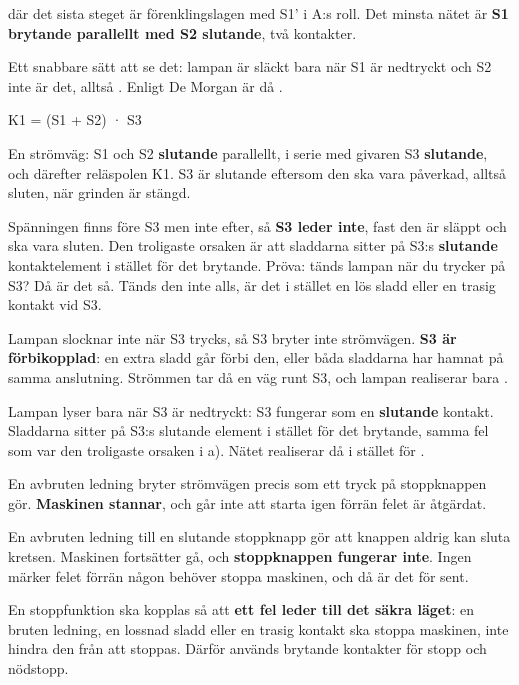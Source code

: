 \noindent där det sista steget är förenklingslagen med S1' i A:s roll. Det minsta nätet är
\textbf{S1 brytande parallellt med S2 slutande}, två kontakter.

Ett snabbare sätt att se det: lampan är släckt bara när S1 är nedtryckt och S2 inte är det, alltså
. Enligt De Morgan är då .

\leavevmode

\begin{textdrawing}
K1 = (S1 + S2) · S3
\end{textdrawing}

\noindent En strömväg: S1 och S2 \textbf{slutande} parallellt, i serie med givaren S3
\textbf{slutande}, och därefter reläspolen K1. S3 är slutande eftersom den ska vara påverkad,
alltså sluten, när grinden är stängd.

Spänningen finns före S3 men inte efter, så \textbf{S3 leder inte}, fast den är släppt och
ska vara sluten. Den troligaste orsaken är att sladdarna sitter på S3:s \textbf{slutande}
kontaktelement i stället för det brytande. Pröva: tänds lampan när du trycker på S3? Då är det så.
Tänds den inte alls, är det i stället en lös sladd eller en trasig kontakt vid S3.

Lampan slocknar inte när S3 trycks, så S3 bryter inte strömvägen. \textbf{S3 är
förbikopplad}: en extra sladd går förbi den, eller båda sladdarna har hamnat på samma anslutning.
Strömmen tar då en väg runt S3, och lampan realiserar bara .

Lampan lyser bara när S3 är nedtryckt: S3 fungerar som en \textbf{slutande} kontakt.
Sladdarna sitter på S3:s slutande element i stället för det brytande, samma fel som var den
troligaste orsaken i a). Nätet realiserar då  i stället för
.

En avbruten ledning bryter strömvägen precis som ett tryck på stoppknappen gör.
\textbf{Maskinen stannar}, och går inte att starta igen förrän felet är åtgärdat.

En avbruten ledning till en slutande stoppknapp gör att knappen aldrig kan sluta kretsen.
Maskinen fortsätter gå, och \textbf{stoppknappen fungerar inte}. Ingen märker felet förrän någon
behöver stoppa maskinen, och då är det för sent.

En stoppfunktion ska kopplas så att \textbf{ett fel leder till det säkra läget}: en bruten
ledning, en lossnad sladd eller en trasig kontakt ska stoppa maskinen, inte hindra den från att
stoppas. Därför används brytande kontakter för stopp och nödstopp.

